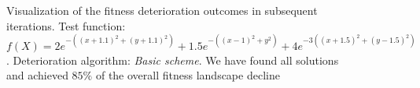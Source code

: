 \begin{figure}
  \centering
  \caption{Visualization of the fitness deterioration outcomes in subsequent
  iterations. Test function: $f(X) = 2e^{-((x+1.1)^2 + (y+1.1)^2)} + 1.5e^{-((x-1)^2 + y^2)} +
  4e^{-3((x+1.5)^2 + (y-1.5)^2)}$. Deterioration algorithm: \textit{Basic
  scheme}. We have found all solutions and achieved $85\%$ of the overall
  fitness landscape decline}
  \label{seqNichingPop}
\end{figure}





